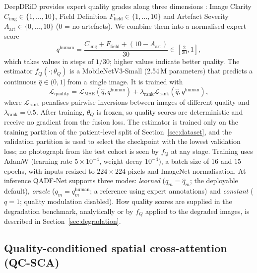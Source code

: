 \documentclass[final,5p,times,twocolumn,authoryear]{elsarticle}
\newcommand{\qadfnet}{QADF-Net}
\theoremstyle{plain}
\theoremstyle{remark}
\begin{document}
DeepDRiD provides expert quality grades along three dimensions \citep{Liu2022deepdrid}: Image Clarity $C_{\text{img}} \in \{1, \dots, 10\}$, Field Definition $F_{\text{field}} \in \{1, \dots, 10\}$ and Artefact Severity $A_{\text{art}} \in \{0, \dots, 10\}$ (0 = no artefacts). We combine them into a normalised expert score
\begin{equation}
  q^{\text{human}} = \frac{C_{\text{img}} + F_{\text{field}} + (10 - A_{\text{art}})}{30} \in \left[\tfrac{2}{30}, 1\right],
  \label{eq:qhuman}
\end{equation}
which takes values in steps of $1/30$; higher values indicate better quality. The estimator $f_Q(\cdot;\theta_Q)$ is a MobileNetV3-Small \citep{Howard2019mobilenetv3} (2.54\,M parameters) that predicts a continuous $\hat{q} \in (0,1]$ from a single image. It is trained with
\begin{equation}
  \mathcal{L}_{\text{quality}} = \mathcal{L}_{\text{MSE}}(\hat{q}, q^{\text{human}}) + \lambda_{\text{rank}} \mathcal{L}_{\text{rank}}(\hat{q}, q^{\text{human}}),
  \label{eq:l_quality}
\end{equation}
where $\mathcal{L}_{\text{rank}}$ penalises pairwise inversions between images of different quality and $\lambda_{\text{rank}} = 0.5$. After training, $\theta_Q$ is frozen, so quality scores are deterministic and receive no gradient from the fusion loss.
The estimator is trained only on the training partition of the patient-level split of Section~\ref{sec:dataset}, and the validation partition is used to select the checkpoint with the lowest validation loss; no photograph from the test cohort is seen by $f_Q$ at any stage. Training uses AdamW (learning rate $5\times10^{-4}$, weight decay $10^{-4}$), a batch size of $16$ and $15$ epochs, with inputs resized to $224\times224$ pixels and ImageNet normalisation.
At inference \qadfnet{} supports three modes: \emph{learned} ($q_m = \hat{q}_m$; the deployable default), \emph{oracle} ($q_m = q_m^{\text{human}}$; a reference using expert annotations) and \emph{constant} ($q=1$; quality modulation disabled). How quality scores are supplied in the degradation benchmark, analytically or by $f_Q$ applied to the degraded images, is described in Section~\ref{sec:degradation}.

\subsection{Quality-conditioned spatial cross-attention (QC-SCA)}
\label{sec:qcsca}
\end{document}

